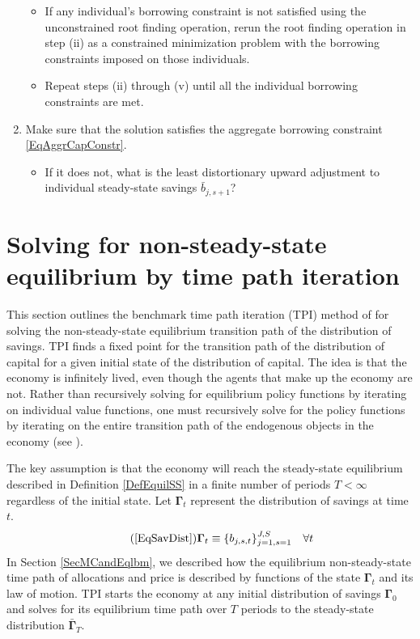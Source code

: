 \documentclass[letterpaper,12pt]{article}
\theoremstyle{definition}
\begin{document}
\begin{enumerate}
      \begin{itemize}
        \item If any individual's borrowing constraint is not satisfied using the unconstrained root finding operation, rerun the root finding operation in step (ii) as a constrained minimization problem with the borrowing constraints imposed on those individuals.
        \item Repeat steps (ii) through (v) until all the individual borrowing constraints are met.
      \end{itemize}
    \item Make sure that the solution satisfies the aggregate borrowing constraint \eqref{EqAggrCapConstr}.
      \begin{itemize}
        \item If it does not, what is the least distortionary upward adjustment to individual steady-state savings $\bar{b}_{j,s+1}$?
      \end{itemize}
  \end{enumerate}


\newpage
\section{Solving for non-steady-state equilibrium by time path iteration}\label{AppNonSSsolve}

  \setcounter{equation}{0}

  This section outlines the benchmark time path iteration (TPI) method of \citet{AuerbachKotlikoff:1987} for solving the non-steady-state equilibrium transition path of the distribution of savings. TPI finds a fixed point for the transition path of the distribution of capital for a given initial state of the distribution of capital. The idea is that the economy is infinitely lived, even though the agents that make up the economy are not. Rather than recursively solving for equilibrium policy functions by iterating on individual value functions, one must recursively solve for the policy functions by iterating on the entire transition path of the endogenous objects in the economy (see \citet[ch. 17]{StokeyLucas:1989}).

  The key assumption is that the economy will reach the steady-state equilibrium described in Definition \ref{DefEquilSS} in a finite number of periods $T<\infty$ regardless of the initial state. Let $\bm{\Gamma}_t$ represent the distribution of savings at time $t$.
  \begin{equation}\tag{\ref{EqSavDist}}
    \bm{\Gamma}_t \equiv \{b_{j,s,t}\}_{j=1,s=1}^{J,S} \quad\forall t
  \end{equation}
  In Section \ref{SecMCandEqlbm}, we described how the equilibrium non-steady-state time path of allocations and price is described by functions of the state $\bm{\Gamma}_t$ and its law of motion. TPI starts the economy at any initial distribution of savings $\bm{\Gamma}_0$ and solves for its equilibrium time path over $T$ periods to the steady-state distribution $\bar{\bm{\Gamma}}_T$.
\end{document}
